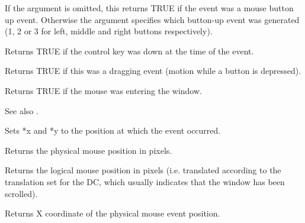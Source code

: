 

If the argument is omitted, this returns TRUE if the event was a mouse
button up event. Otherwise the argument specifies which button-up event
was generated (1, 2 or 3 for left, middle and right buttons respectively).



Returns TRUE if the control key was down at the time of the event.



Returns TRUE if this was a dragging event (motion while a button is depressed).

\label{wxmouseevententering}


Returns TRUE if the mouse was entering the window.

See also .

\label{wxmouseeventgetposition}




Sets *x and *y to the position at which the event occurred.

Returns the physical mouse position in pixels.

\label{wxmouseeventgetlogicalposition}


Returns the logical mouse position in pixels (i.e. translated according to the
translation set for the DC, which usually indicates that the window has been scrolled).

\label{wxmouseeventgetx}


Returns X coordinate of the physical mouse event position.

